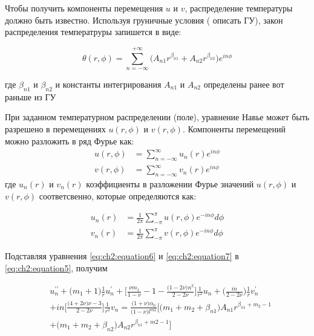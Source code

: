 Чтобы получить компоненты перемещения \(u\) и \(v\), распределение температуры должно быть известно. Используя груничные условия ({\color{red} описать ГУ}), закон распределения температруры запишется в виде:

\begin{equation}
	\label{eq:ch2:equation6}
	\theta(r, \phi) = \sum_{n=-\infty}^{+\infty} \big (A_{n1} r^{\beta_{n1}} + A_{n2} r^{\beta_{n2}} \big ) e^{in \phi}
\end{equation}

где \(\beta_{n1}\) и \(\beta_{n2}\) и константы интегрирования \(A_{n1}\) и \(A_{n2}\) определены ранее {\color{red} вот раньше из ГУ} 

При заданном температурном распределении (поле), уравнение Навье может быть разрешено в перемещениях \(u(r, \phi) \) и \(v(r, \phi) \). Компоненты перемещений можно разложить в ряд Фурье как:
\begin{equation}
\label{eq:ch2:equation7}
\begin{split}
	u(r, \phi) &= \sum_{n=-\infty}^{\infty} u_n(r) e^{in\phi}\\
	v(r, \phi) &= \sum_{n=-\infty}^{\infty} v_n(r) e^{in\phi}
\end{split}
\end{equation}
где \(u_n(r)\) и \(v_n(r)\) коэффициенты в разложении Фурье значений \(u(r, \phi)\) и \(v(r, \phi)\) соответсвенно, которые определяются как:

\begin{equation}
\label{eq:ch2:equation8}
\begin{split}
	u_n(r) &= \frac{1}{2\pi} \sum_{-\pi}^{\pi} u(r, \phi) e^{-in\phi} d\phi\\
	v_n(r) &= \frac{1}{2\pi} \sum_{-\pi}^{\pi} v(r, \phi) e^{-in\phi} d\phi
\end{split}
\end{equation}

Подставляя уравнения \cref{eq:ch2:equation6} и \cref{eq:ch2:equation7} в \cref{eq:ch2:equation5}, получим

\begin{equation}
\label{eq:ch2:equation9}
\begin{split}
	&u_n^{\prime\prime} + \big ( m_1 + 1 \big ) \frac{1}{r} u_n^{\prime} + \big [ \frac{\nu m_1}{1-\nu} -1 - \frac{\big ( 1 - 2\nu \big )n^2}{2-2\nu} \big ] \frac{1}{r^2}u_n + \big(\frac{in}{2-2\nu} \big)\frac{1}{r}v_n^{\prime}\\
&+in \big [ \frac{ \big (4+2\nu \big )\nu -3}{2-2\nu}\big ]\frac{1}{r^2}v_n = \frac{\big (1+\nu \big ) \alpha_0}{\big (1-\nu \big )l^{m2}} \big [ \big (m_1 + m_2 +\beta_{n1} \big )A_{n1} r^{\beta_{n1}+m_2-1} \\
&+ \big(m_1 +m_2 + \beta_{n2} \big ) A_{n2} r^{\beta_{n1}+m2-1} \big ]
\end{split}
\end{equation}

